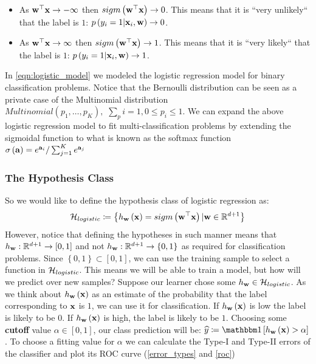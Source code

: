 \begin{itemize}
	\item As $\mathbf{w}^\top\mathbf{x}\rightarrow -\infty$ then $sigm\left(\mathbf{w}^\top\mathbf{x}\right)\rightarrow 0$. This means that it is ``very unlikely`` that the label is $1$:  $p\left(y_i=1|\mathbf{x}_i,\mathbf{w}\right)\rightarrow 0$. 
	\item As $\mathbf{w}^\top\mathbf{x}\rightarrow \infty$ then $sigm\left(\mathbf{w}^\top\mathbf{x}\right)\rightarrow 1$. This means that it is ``very likely`` that the label is $1$: $p\left(y_i=1|\mathbf{x}_i,\mathbf{w}\right)\rightarrow 1$. 
\end{itemize}


\begin{remark}
	In \ref{eqn:logistic_model} we modeled the logistic regression model for binary classification problems. Notice that the Bernoulli distribution can be seen as a private case of the Multinomial distribution $Multinomial\left(p_1,\ldots,p_K\right),\,\,\sum_pi=1, 0\leq p_i\leq 1$. We can expand the above logistic regression model to fit multi-classification problems by extending the sigmoidal function to what is known as the softmax function $\sigma\left(\mathbf{a}\right)=e^{\mathbf{a}_i}/\sum^K_{j=1}e^{\mathbf{a}_j}$
\end{remark}

\subsubsection{The Hypothesis Class}
So we would like to define the hypothesis class of logistic regression as: 
\begin{equation}
	\mathcal{H}_{logistic}\coloneqq\left\{h_{\mathbf{w}}\left(\mathbf{x}\right)=sigm\left(\mathbf{w}^\top\mathbf{x}\right)|\mathbf{w}\in\mathbb{R}^{d+1}\right\}
	\label{eqn:logisitc_hypothesis_class}
\end{equation}
However, notice that defining the hypotheses in such manner means that $h_{\mathbf{w}}:\mathbb{R}^{d+1}\rightarrow\left[0,1\right]$ and not $h_{\mathbf{w}}:\mathbb{R}^{d+1}\rightarrow\left\{0,1\right\}$ as required for classification problems. Since $\left\{0,1\right\}\subset\left[0,1\right]$, we can use the training sample to select a function in $\mathcal{H}_{logistic}$. This means we will be able to train a model, but how will we predict over new samples? Suppose our learner chose some $h_{\mathbf{w}}\in\mathcal{H}_{logistic}$. As we think about $h_{\mathbf{w}}\left(\mathbf{x}\right)$ as an estimate of the probability that the label corresponding to $\mathbf{x}$ is $1$, we can use it for classification. If $h_{\mathbf{w}}\left(\mathbf{x}\right)$ is low the label is likely to be $0$. If $h_{\mathbf{w}}\left(\mathbf{x}\right)$ is high, the label is likely to be $1$. Choosing some \textbf{cutoff} value $\alpha\in\left[0,1\right]$, our class prediction will be: $\widehat{y}\coloneqq \indc{h_{\w}\left(\x\right)>\alpha} $. To choose a fitting value for $\alpha$ we can calculate the Type-I and Type-II errors of the classifier and plot its ROC curve (\autoref{error_types} and \autoref{roc})


